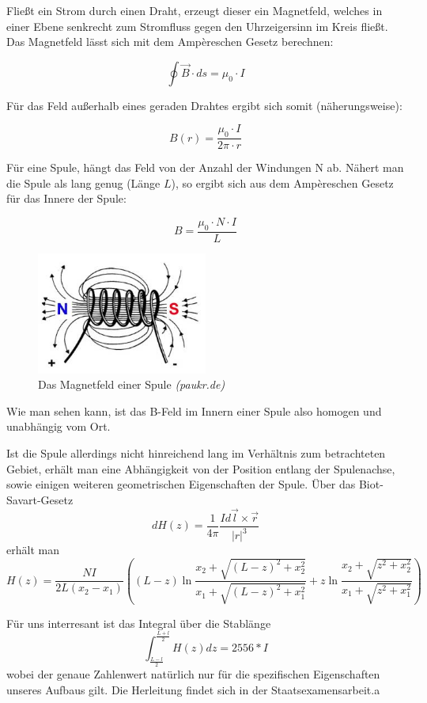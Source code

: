 Fließt ein Strom durch einen Draht, erzeugt dieser ein Magnetfeld, welches in einer Ebene senkrecht zum Stromfluss gegen den Uhrzeigersinn im Kreis fließt. Das Magnetfeld lässt sich mit dem Ampèreschen Gesetz berechnen:

\begin{equation} \oint \vec B \cdot ds = \mu_0\cdot I \end{equation}

Für das Feld außerhalb eines geraden Drahtes ergibt sich somit (näherungsweise):

$$B(r) = \frac{\mu_0\cdot I}{2\pi\cdot r} $$

Für eine Spule, hängt das Feld von der Anzahl der Windungen N ab. Nähert man die Spule als lang genug (Länge $L$), so ergibt sich aus dem Ampèreschen Gesetz für das Innere der Spule:

\begin{equation} B = \frac{\mu_0\cdot N\cdot I}{L} \end{equation}


\begin{figure}[H]
	\centering \includegraphics[width = 0.5\textwidth]{Bilder/Spule.jpg}
	\caption{Das Magnetfeld einer Spule \emph{(paukr.de)}}
\end{figure}

Wie man sehen kann, ist das B-Feld im Innern einer Spule also homogen und unabhängig vom Ort.

Ist die Spule allerdings nicht hinreichend lang im Verhältnis zum betrachteten Gebiet, erhält man eine Abhängigkeit von der Position entlang der Spulenachse, sowie einigen weiteren geometrischen Eigenschaften der Spule. Über das Biot-Savart-Gesetz
$$  dH\left( z \right) = \frac{1}{4 \pi} \frac{I d\vec{l} \times \vec{r}}{\left|r\right|^3} $$
erhält man
$$ H \left( z \right) = \frac{N I}{2 L \left( x_2 - x_1 \right)} \left( \left( L - z \right) \ln \frac{x_2 + \sqrt{\left( L-z \right)^2 + x_2^2}}{x_1 + \sqrt{\left( L - z \right)^2 + x_1^2}} + z \ln \frac{x_2 + \sqrt{z^2 + x_2^2}}{x_1 + \sqrt{z^2 + x_1^2}}  \right) $$

Für uns interresant ist das Integral über die Stablänge
$$ \int_{\frac{L-l}{2}}^{\frac{L+l}{2}} H\left( z \right) dz = 2556*I $$
wobei der genaue Zahlenwert natürlich nur für die spezifischen Eigenschaften unseres Aufbaus gilt. Die Herleitung findet sich in der Staatsexamensarbeit.a


\clearpage